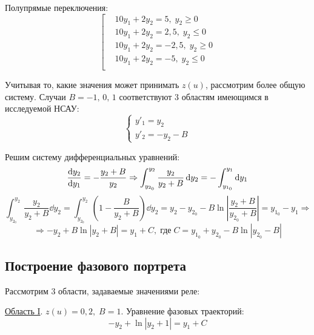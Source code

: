 	Полупрямые переключения:
	\begin{equation}
		\left[
		\begin{aligned}
			&10y_1 + 2y_2 = 5,\;y_2 \geq 0 \\
			&10y_1 + 2y_2 = 2,5,\;y_2 \leq 0 \\
			&10y_1 + 2y_2 = -2,5,\;y_2 \geq 0 \\
			&10y_1 + 2y_2 = -5,\;y_2 \leq 0 \\
		\end{aligned}\right.
		\label{lines}
	\end{equation}

	Учитывая то, какие значения может принимать $z(u)$, рассмотрим более общую систему. Случаи $B=-1,\, 0,\, 1$ соответствуют 3 областям имеющимся в исследуемой НСАУ:
	\begin{equation*}
		\begin{cases}
			y'_1 = y_2 \\
			y'_2 = -y_2 - B
		\end{cases}
	\end{equation*}

	Решим систему дифференциальных уравнений:
	\begin{equation*}
		\dv{y_2}{y_1}= -\frac{y_2+B}{y_2} \Rightarrow \int_{y_{2_0}}^{y_2} \frac{y_2}{y_2+B} \dd{y_2} = -\int_{y_{1_0}}^{y_1} \dd{y_1}
	\end{equation*}
	\begin{equation*}
		\int_{y_{2_0}}^{y_2} \frac{y_2}{y_2+B} \dd{y_2} = \int_{y_{2_0}}^{y_2} \left(1 -\frac{B}{y_2+B}\right) \dd{y_2} = y_2 - y_{2_0} - B\ln{\left|\frac{y_2+B}{y_{2_0}+B}\right|} = y_{1_0} - y_1 \Rightarrow
	\end{equation*}
	\begin{equation*}
		\Rightarrow -y_2 + B\ln{|y_2+B|} = y_1 + C,\;\text{где}\; C= y_{1_0} + y_{2_0} - B\ln{|y_{2_0} - B|}
	\end{equation*}

	\subsection{Построение фазового портрета} 
	
	Рассмотрим 3 области, задаваемые значениями реле:
	
	\underline{Область I}. $z(u) = 0,2,\;B=1$. Уравнение фазовых траекторий:
	\begin{equation*}
		-y_2 + \ln{|y_2+1|} = y_1 + C
	\end{equation*}

